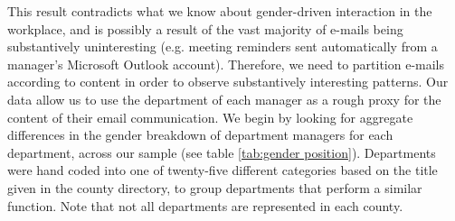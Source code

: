 \documentclass{pnastwo}
\begin{document}
\begin{article}
%


This result contradicts what we know about gender-driven interaction
in the workplace, and is possibly a result of the vast majority of
e-mails being substantively uninteresting (e.g. meeting reminders sent
automatically from a manager's Microsoft Outlook account). Therefore,
we need to partition e-mails according to content in order to observe
substantively interesting patterns. Our data allow us to use the
department of each manager as a rough proxy for the content of their
email communication. We begin by looking for aggregate differences in
the gender breakdown of department managers for each department,
across our sample (see table \ref{tab:gender position}). Departments
were hand coded into one of twenty-five different categories based on
the title given in the county directory, to group departments that
perform a similar function. Note that not all departments are
represented in each county.


\end{article}
\end{document}
